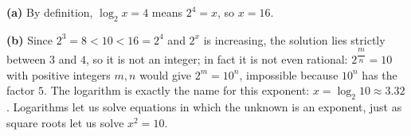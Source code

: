\textbf{(a)} By definition, $\log_2x=4$ means $2^4=x$, so $x=\boxed{16}$.

\textbf{(b)} Since $2^3=8<10<16=2^4$ and $2^x$ is increasing, the solution lies strictly between $3$ and $4$, so it is not an integer; in fact it is not even rational: $2^{\dfrac {m}{n}}=10$ with positive integers $m,n$ would give $2^m=10^n$, impossible because $10^n$ has the factor $5$. The logarithm is exactly the name for this exponent: $x=\boxed{\log_2 10}\approx3.32$. Logarithms let us solve equations in which the unknown is an exponent, just as square roots let us solve $x^2=10$.
